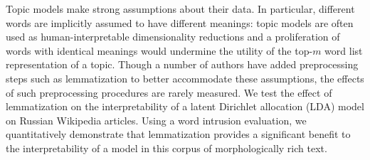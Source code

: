     Topic models make strong assumptions about their data.  In
    particular, different words are implicitly assumed to
    have different meanings: topic models are often used as
    human-interpretable dimensionality reductions and a proliferation
    of words with identical meanings would undermine the utility of the
    top-$m$ word list representation of a topic.  Though a number
    of authors have added preprocessing steps such as lemmatization to
    better accommodate these assumptions, the effects of such
    preprocessing procedures are rarely measured.  We test the
    effect of lemmatization on the interpretability of a
    latent Dirichlet allocation (LDA) model on Russian Wikipedia
    articles.  Using a word intrusion evaluation, we quantitatively
    demonstrate that lemmatization provides a significant benefit to
    the interpretability of a model in this corpus of morphologically
    rich text.
